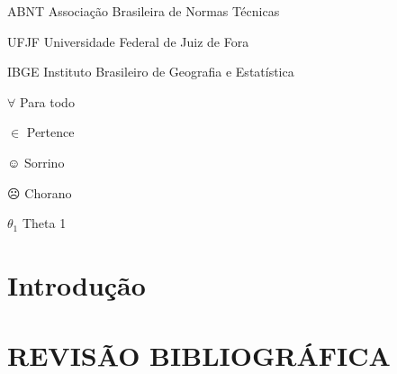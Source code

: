 \documentclass[
        12pt,
        openany, %
        oneside, %
        a4paper,			
        english,			
        brazil			        %
        ]{abntbibufjf}
\begin{document}
\listoftables*
\cleardoublepage

\begin{siglas} %
 \item[ABNT] Associa\c{c}\~ao Brasileira de Normas T\'ecnicas
 \item[UFJF] Universidade Federal de Juiz de Fora
 \item[IBGE] Instituto Brasileiro de Geografia e Estat\'istica
\end{siglas}

\begin{simbolos} %
  \item[$ \forall $] Para todo
  \item[$ \in $] Pertence
  \item[$\smiley$] Sorrino
  \item[$\frownie{}$] Chorano
  \item[$\theta_1$] Theta 1

 \end{simbolos}

 
\tableofcontents*
\cleardoublepage



\textual
\pagestyle{simple}   




\chapter{Introdução}


\chapter{REVISÃO BIBLIOGRÁFICA}


\end{document}
